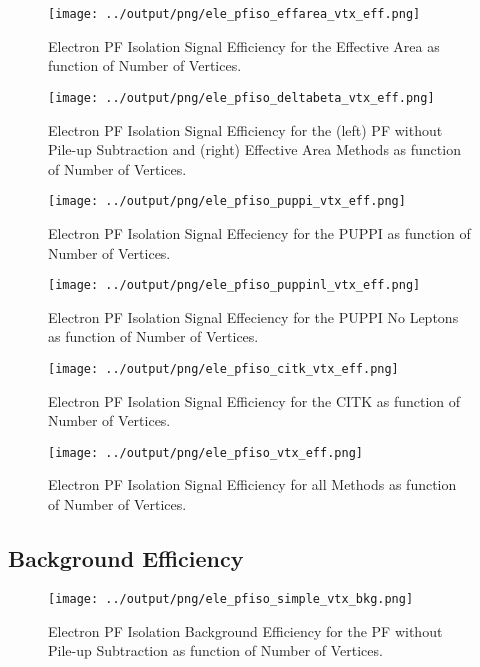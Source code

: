\documentclass[11pt]{book}
\begin{document}
\begin{figure}[htb]
\centering
\texttt{[image: ../output/png/ele\_pfiso\_effarea\_vtx\_eff.png]}
\caption{Electron PF Isolation Signal Efficiency for the Effective Area as function of Number of Vertices.}
\label{fig:ele_pfiso_vtx_eff_effarea}
\end{figure}

\begin{figure}[htb]
\centering
\texttt{[image: ../output/png/ele\_pfiso\_deltabeta\_vtx\_eff.png]}
\caption{Electron PF Isolation Signal Efficiency for the (left) PF without Pile-up Subtraction and (right) Effective Area Methods as function of Number of Vertices.}
\label{fig:ele_pfiso_vtx_eff_deltabeta}
\end{figure}

\begin{figure}[htb]
\centering
\texttt{[image: ../output/png/ele\_pfiso\_puppi\_vtx\_eff.png]}
\caption{Electron PF Isolation Signal Effeciency for the PUPPI as function of Number of Vertices.}
\label{fig:ele_pfiso_vtx_eff_puppi}
\end{figure}

\begin{figure}[htb]
\centering
\texttt{[image: ../output/png/ele\_pfiso\_puppinl\_vtx\_eff.png]}
\caption{Electron PF Isolation Signal Effeciency for the PUPPI No Leptons as function of Number of Vertices.}
\label{fig:ele_pfiso_vtx_eff_puppinl}
\end{figure}

\begin{figure}[htb]
\centering
\texttt{[image: ../output/png/ele\_pfiso\_citk\_vtx\_eff.png]}
\caption{Electron PF Isolation Signal Efficiency for the CITK as function of Number of Vertices.}
\label{fig:ele_pfiso_vtx_eff_citk}
\end{figure}

\begin{figure}[htb]
\centering
\texttt{[image: ../output/png/ele\_pfiso\_vtx\_eff.png]}
\caption{Electron PF Isolation Signal Efficiency for all Methods as function of Number of Vertices.}
\label{fig:ele_pfiso_vtx_eff}
\end{figure}
\clearpage

\subsection{Background Efficiency}
\begin{figure}[htb]
\centering
\texttt{[image: ../output/png/ele\_pfiso\_simple\_vtx\_bkg.png]}
\caption{Electron PF Isolation Background Efficiency for the PF without Pile-up Subtraction as function of Number of Vertices.}
\label{fig:ele_pfiso_vtx_bkg_simple}
\end{figure}
\end{document}
